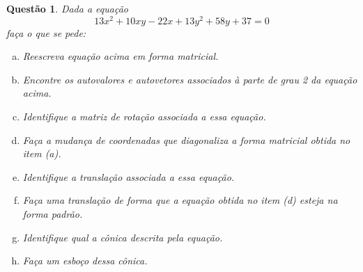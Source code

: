 \documentclass[a4paper,12pt]{article}
\newtheorem{qst}{Questão}
\begin{document}
\begin{qst}	
	Dada a equação \[13 x^2 + 10 x y - 22 x + 13 y^2 + 58 y + 37 = 0\]faça o que se pede:
	\begin{enumerate}[a)]
		\item Reescreva equação acima em forma matricial.
		\item Encontre os autovalores e autovetores associados à parte de grau 2 da equação acima.
		\item Identifique a matriz de rotação associada a essa equação.
		\item Faça a mudança de coordenadas que diagonaliza a forma matricial obtida no item (a).
		\item Identifique a translação associada a essa equação.
		\item Faça uma translação de forma que a equação obtida no item (d) esteja na forma padrão.
		\item Identifique qual a cônica descrita pela equação.
		\item Faça um esboço dessa cônica.
	\end{enumerate}
\end{qst}
\end{document}
